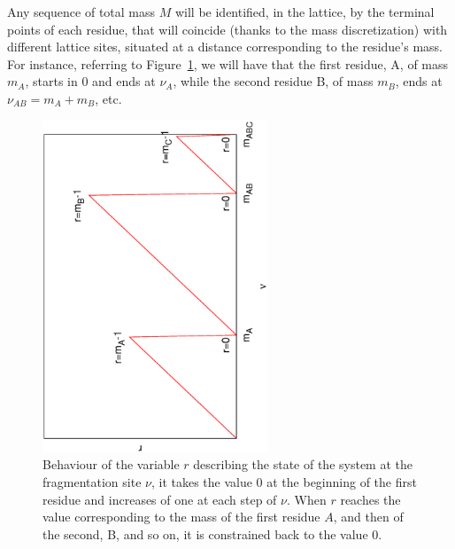 Any sequence of total mass $M$ will be identified, in the lattice, by the
terminal points of each residue, that will coincide (thanks to the mass
discretization) with different lattice sites, situated at a distance
corresponding to the residue's mass. For instance, referring to
Figure~\ref{fig:onesequence}, we will have that the first residue, A, of mass $m_A$,
starts in 0 and ends at $\nu_A$, while  the second residue B, of mass $m_B$, ends at
$\nu_{AB}=m_A+m_B$, etc.

\begin{figure}
\centering
\includegraphics[angle=-90,width=0.6\textwidth]{./img/msms/r.eps}
\caption{\label{fig:onesequence}
Behaviour of the variable $r$ describing the state of the system at the
fragmentation
site $\nu$, it takes the value 0 at the beginning of the first residue and
increases of one at each step of $\nu$. When $r$ reaches the value corresponding
to the mass of the first residue $A$, and then of the second, B, and so on, 
it is constrained back to the value 0.}
\end{figure}

